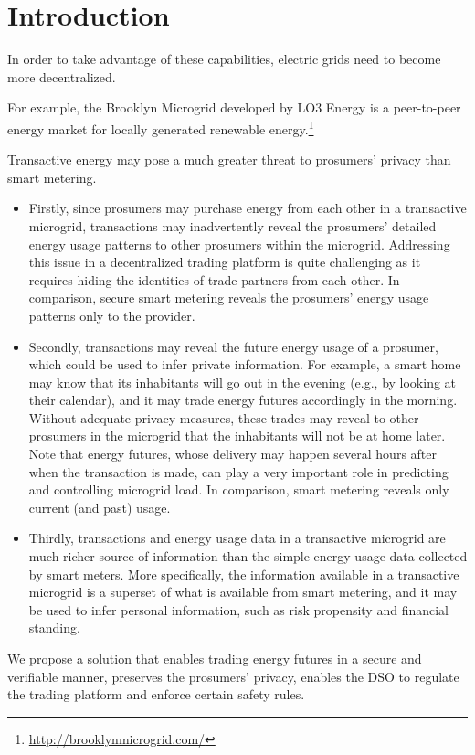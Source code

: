 \section{Introduction}


In order to take advantage of these capabilities, electric grids need to become more decentralized.


For example, the Brooklyn Microgrid developed by LO3 Energy is a peer-to-peer energy market for locally generated renewable energy.\footnote{\url{http://brooklynmicrogrid.com/}}

Transactive energy may pose a much greater threat to prosumers' privacy than smart metering.
\begin{itemize}
\item Firstly, since prosumers may purchase energy from each other in a transactive microgrid, transactions may inadvertently reveal the prosumers' detailed energy usage patterns to other prosumers within the microgrid.
Addressing this issue in a decentralized trading platform is quite challenging as it requires hiding the identities of trade partners from each other.
In comparison, secure smart metering reveals the prosumers' energy usage patterns only to the provider. 
\item Secondly, transactions may reveal the future energy usage of a prosumer, which could be used to infer private information.
For example, a smart home may know that its inhabitants will go out in the evening (e.g., by looking at their calendar), and it may trade energy futures accordingly in the morning.
Without adequate privacy measures, these trades may reveal to other prosumers in the microgrid that the inhabitants will not be at home later.
Note that energy futures, whose delivery may happen several hours after when the transaction is made, can play a very important role in predicting and controlling microgrid load.
In comparison, smart metering reveals only current (and past) usage.
\item Thirdly, transactions and energy usage data in a transactive microgrid are much richer source of information than the simple energy usage data collected by smart meters.
More specifically, the information available in a transactive microgrid is a superset of what is available from smart metering, and it may be used to infer personal information, such as risk propensity and financial standing.
\end{itemize}

We propose a solution that enables trading energy futures in a secure and verifiable manner, preserves the prosumers' privacy, enables the DSO to regulate the trading platform and enforce certain safety rules.

